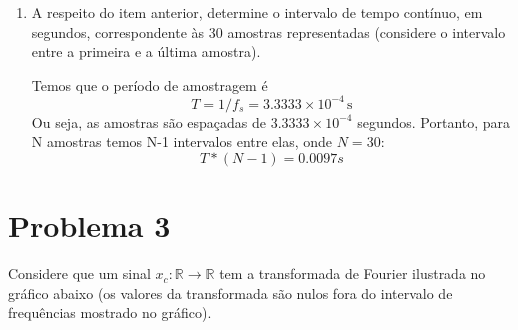 \documentclass[12pt,a4paper]{article}
\begin{document}
\begin{enumerate}
\begin{resposta}
\begin{minipage}[t]{1\textwidth}
\begin{lstlisting}[basicstyle=\ttfamily\scriptsize, numbers=left]
 
f=[200 400 600];
A=[1 2 1.5];
phi=[0 pi/3 pi/4];

f0=gcd(gcd(f(1),f(2)), f(3));
fs=3000; %taxa de amostragem de 3kHz
T=1/fs;
N=30; %;número de amostras
n=(0:N-1);

%x(t)=x[nT]
 
f1=A(1)*sin(2*pi*f(1)*(n*T) + phi(1));
f2=A(2)*sin(2*pi*f(2)*(n*T) + phi(2));
f3=A(3)*sin(2*pi*f(3)*(n*T) + phi(3));

xd= f1+f2+f3;
 

stem(n, xd, "LineWidth",1.2, 'Marker','o');
grid on;
xlabel('Amostra[n]');
ylabel('Amplitude do sinal amostrado x_d[n]');
title('30 amostras do sinal x_d[n] ')
 
 
\end{lstlisting}
\end{minipage}
\hfill
\end{resposta}



  \item A respeito do item anterior, determine o intervalo de tempo contínuo, em segundos,
        correspondente às 30 amostras representadas (considere o intervalo entre a primeira e a
        última amostra).

        \begin{resposta}
            Temos que o período de amostragem é 
            \begin{equation*}
                  T=1/f_s=3.3333 \times 10^{-4}\, \text{s}
            \end{equation*}
            Ou seja, as amostras são espaçadas de $3.3333 \times 10^{-4}$ segundos. Portanto, para N amostras temos N-1 intervalos entre elas, onde $N=30$:
            \begin{equation*}
                  T*(N-1)= 0.0097 s 
            \end{equation*}
        \end{resposta}

\end{enumerate}

\section{Problema 3}
Considere que um sinal $x_c:\mathbb{R}\to\mathbb{R}$ tem a transformada de Fourier ilustrada no
gráfico abaixo (os valores da transformada são nulos fora do intervalo de frequências mostrado no
gráfico).
\end{document}

